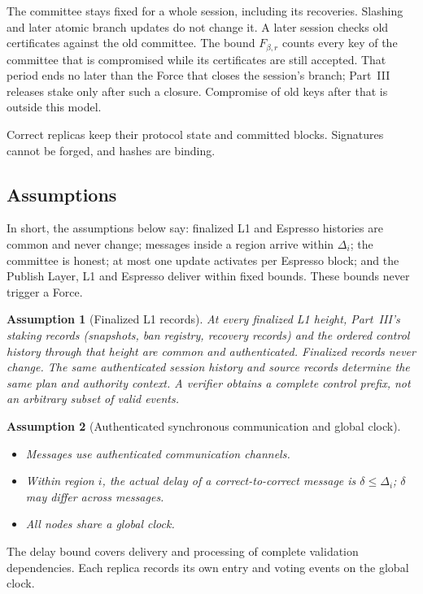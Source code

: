 \documentclass[11pt,a4paper]{article}
\newtheorem{assumption}[assumption]{Assumption}
\newcounter{protocol}
\begin{document}
The committee stays fixed for a whole session, including its recoveries.
Slashing and later atomic branch updates do not change it. A later session
checks old certificates against the old committee. The bound
$F_{\beta,r}$ counts every key of the committee that is compromised while
its certificates are still accepted. That period ends no later than the
Force that closes the session's branch; Part~III releases stake only
after such a closure. Compromise of old keys after that is outside this
model.

Correct replicas keep their protocol state and committed blocks.
Signatures cannot be forged, and hashes are binding.

\subsection{Assumptions}
\label{sec:assumptions}
In short, the assumptions below say: finalized L1 and Espresso histories
are common and never change; messages inside a region arrive within
$\Delta_i$; the committee is honest; at most one update activates per
Espresso block; and the Publish Layer, L1 and Espresso deliver within
fixed bounds. These bounds never trigger a Force.
\begin{assumption}[Finalized L1 records]
\label{ass:authority}
At every finalized L1 height, Part~III's staking records (snapshots, ban
registry, recovery records) and the ordered control history through that
height are common and authenticated. Finalized records never change. The
same authenticated session history and source records determine the same
plan and authority context. A verifier obtains a complete control
prefix, not an arbitrary subset of valid events.
\end{assumption}

\begin{assumption}[Authenticated synchronous communication and global clock]
\label{ass:network}
\leavevmode\par
\begin{itemize}
\item Messages use authenticated communication channels.
\item Within region $i$, the actual delay of a correct-to-correct
message is $\delta\le\Delta_i$; $\delta$ may differ across messages.
\item All nodes share a global clock.
\end{itemize}
\end{assumption}
The delay bound covers delivery and processing of complete validation
dependencies. Each replica records its own entry and voting events on
the global clock.
\end{document}
